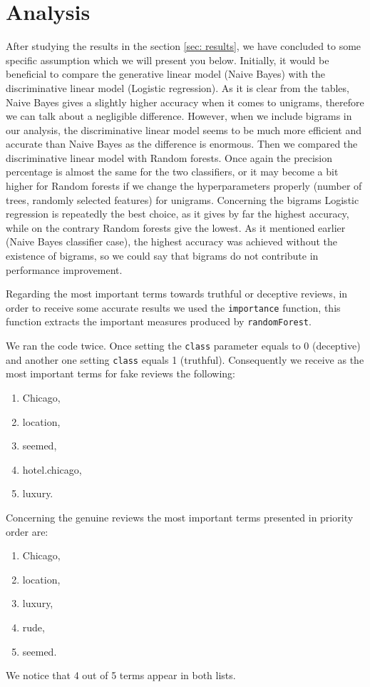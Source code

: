 \documentclass[a4paper,11pt]{article}
\begin{document}
\section{Analysis}
\label{sec: analysis}

After studying the results in the section \ref{sec: results}, we have concluded to some specific assumption which we will present you below. Initially, it would be beneficial to compare the generative linear model (Naive Bayes) with the discriminative linear model (Logistic regression). As it is clear from the tables, Naive Bayes gives a slightly higher accuracy when it comes to unigrams, therefore we can talk about a negligible difference. However, when we include bigrams in our analysis, the discriminative linear model seems to be much more efficient and accurate than Naive Bayes as the difference is enormous. Then we compared the discriminative linear model with Random forests. Once again the precision percentage is almost the same for the two classifiers, or it may become a bit higher for Random forests if we change the hyperparameters properly (number of trees, randomly selected features) for unigrams. Concerning the bigrams Logistic regression is repeatedly the best choice, as it gives by far the highest accuracy, while on the contrary Random forests give the lowest. As it mentioned earlier (Naive Bayes classifier case), the highest accuracy was achieved without the existence of bigrams, so we could say that bigrams do not contribute in performance improvement.

Regarding the most important terms towards truthful or deceptive reviews, in order to receive some accurate results we used the \verb|importance| function, this function extracts the important measures produced by \verb|randomForest|.

We ran the code twice. Once setting the \verb|class| parameter equals to 0 (deceptive) and another one setting \verb|class| equals 1 (truthful). Consequently we receive as the most important terms for fake reviews
the following: 
\begin{enumerate}
	\item Chicago, 
	\item location, 
	\item seemed, 
	\item hotel.chicago,
	\item luxury. 
\end{enumerate}
Concerning the genuine reviews the most important terms presented in priority order are: 
\begin{enumerate}
	\item Chicago, 
	\item location, 
	\item luxury, 
	\item rude, 
	\item seemed.
\end{enumerate}
We notice that 4 out of 5 terms appear in both lists.



\end{document}

